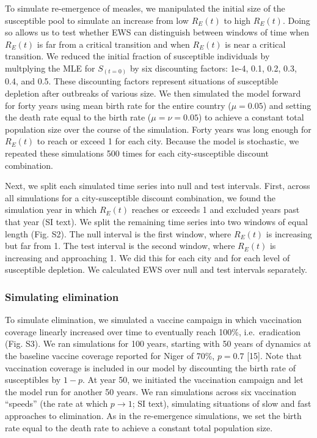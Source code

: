 \documentclass[3p]{elsarticle} %
\begin{document}
To simulate re-emergence of measles, we manipulated the initial size of
the susceptible pool to simulate an increase from low \(R_E(t)\) to high
\(R_E(t)\). Doing so allows us to test whether EWS can distinguish
between windows of time when \(R_E(t)\) is far from a critical
transition and when \(R_E(t)\) is near a critical transition. We reduced
the initial fraction of susceptible individuals by multplying the MLE
for \(S_{(t=0)}\) by six discounting factors: 1e-4, 0.1, 0.2, 0.3, 0.4,
and 0.5. These discounting factors represent situations of susceptible
depletion after outbreaks of various size. We then simulated the model
forward for forty years using mean birth rate for the entire country
(\(\mu = 0.05\)) and setting the death rate equal to the birth rate
(\(\mu = \nu = 0.05\)) to achieve a constant total population size over
the course of the simulation. Forty years was long enough for \(R_E(t)\)
to reach or exceed 1 for each city. Because the model is stochastic, we
repeated these simulations 500 times for each city-susceptible discount
combination.

Next, we split each simulated time series into null and test intervals.
First, across all simulations for a city-susceptible discount
combination, we found the simulation year in which \(R_E(t)\) reaches or
exceeds 1 and excluded years past that year (SI text). We split the
remaining time series into two windows of equal length (Fig. S2). The
null interval is the first window, where \(R_E(t)\) is increasing but
far from 1. The test interval is the second window, where \(R_E(t)\) is
increasing and approaching 1. We did this for each city and for each
level of susceptible depletion. We calculated EWS over null and test
intervals separately.

\hypertarget{simulating-elimination}{%
\subsubsection{Simulating elimination}\label{simulating-elimination}}

To simulate elimination, we simulated a vaccine campaign in which
vaccination coverage linearly increased over time to eventually reach
100\%, i.e.~eradication (Fig. S3). We ran simulations for 100 years,
starting with 50 years of dynamics at the baseline vaccine coverage
reported for Niger of 70\%, \(p = 0.7\) {[}15{]}. Note that vaccination
coverage is included in our model by discounting the birth rate of
susceptibles by \(1-p\). At year 50, we initiated the vaccination
campaign and let the model run for another 50 years. We ran simulations
across six vaccination ``speeds'' (the rate at which
\(p \rightarrow 1\); SI text), simulating situations of slow and fast
approaches to elimination. As in the re-emergence simulations, we set
the birth rate equal to the death rate to achieve a constant total
population size.
\end{document}
